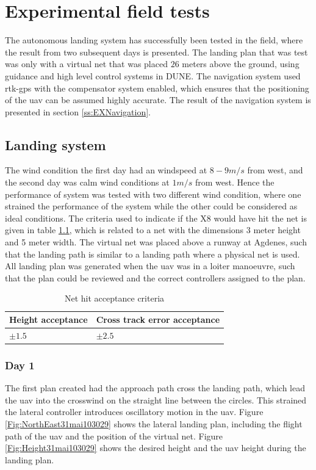 \chapter{Experimental field tests}
The autonomous landing system has successfully been tested in the field, where the result from two subsequent days is presented. The landing plan that was test was only with a virtual net that was placed $26$ meters above the ground, using guidance and high level control systems in DUNE. The navigation system used \gls{rtk-gps} with the compensator system enabled, which ensures that the positioning of the \gls{uav} can be assumed highly accurate. The result of the navigation system is presented in section \ref{ss:EXNavigation}.
\section{Landing system}
The wind condition the first day had an windspeed at $8-9 m/s$ from west, and the second day was calm wind conditions at $1 m/s$ from west. Hence the performance of system was tested with two different wind condition, where one strained the performance of the system while the other could be considered as ideal conditions. The criteria used to indicate if the X8 would have hit the net is given in table \ref{tb:NetCriteria}, which is related to a net with the dimensions 3 meter height and 5 meter width. The virtual net was placed above a runway at Agdenes, such that the landing path is similar to a landing path where a physical net is used. All landing plan was generated when the \gls{uav} was in a loiter manoeuvre, such that the plan could be reviewed and the correct controllers assigned to the plan.
\begin{table}[H]
\centering
\begin{tabular}{| l | l |}
\hline
\textbf{Height acceptance}	& \textbf{Cross track error acceptance}	\\ \hline
$\pm1.5$					& $\pm2.5$								\\ \hline
\end{tabular}
\caption{Net hit acceptance criteria}
\label{tb:NetCriteria}
\end{table} 
\newpage
\subsection{Day 1}
The first plan created had the approach path cross the landing path, which lead the \gls{uav} into the crosswind on the straight line between the circles. This strained the lateral controller introduces oscillatory motion in the \gls{uav}. Figure \ref{Fig:NorthEast31mai103029} shows the lateral landing plan, including the flight path of the \gls{uav} and the position of the virtual net. Figure \ref{Fig:Height31mai103029} shows the desired height and the \gls{uav} height during the landing plan.

